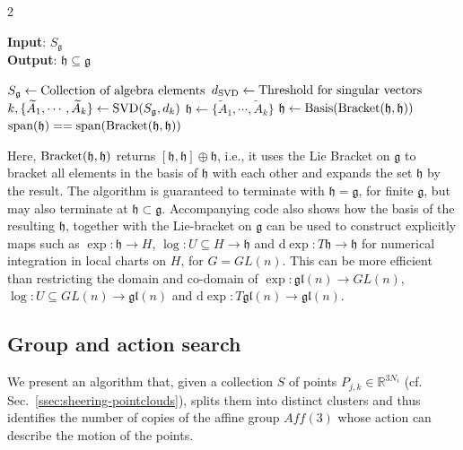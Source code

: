 \documentclass{article}
\newcommand{\g}{\mathfrak{g}}                               %
\newcommand{\h}{\mathfrak{h}}                               %
\newcommand{\R}{\mathbb{R}}                                 %
\newcommand{\ext}{\text{d}}                                 %
\begin{document}
\begin{multicols}{2}
\begin{algorithm}[H]
    \caption{Subalgebra search}\label{app:alg_subalgebra_search}
    \hspace*{\algorithmicindent} \textbf{Input}: $S_\g$ \\
    \hspace*{\algorithmicindent} \textbf{Output}: $\mathfrak{h}\subseteq \g$ 
    \begin{algorithmic}[1]
        \State $S_\g \gets \textnormal{Collection of algebra elements}$
        \State $d_{\textnormal{SVD}} \gets \textnormal{Threshold for singular vectors}$
        \State $k, \{\widetilde{A}_1,\cdots, \widetilde{A}_k\} \gets \textnormal{SVD}(S_\g, d_k)$
        \State $\h \gets \{\widetilde{A}_1,\cdots, \widetilde{A}_k\}$
        \Repeat
            \State $\h \gets \textnormal{Basis}(\textnormal{Bracket}(\h,\h))$
        \Until $\textnormal{span}(\h) == \textnormal{span}(\textnormal{Bracket}(\h,\h))$
    \end{algorithmic}
\end{algorithm}
Here, $\textnormal{Bracket}(\h,\h)$ returns $[\h,\h]\oplus\h$, i.e., it uses the Lie Bracket on $\g$ to bracket all elements in the basis of $\h$ with each other and expands the set $\h$ by the result. The algorithm is guaranteed to terminate with $\h = \g$, for finite $\g$, but may also terminate at $\h \subset \g$.
Accompanying code also shows how the basis of the resulting $\h$, together with the Lie-bracket on $\g$ can be used to construct explicitly maps such as $\exp:\h \rightarrow H$, $\log: U\subseteq H \rightarrow\h$ and $\ext\exp:T \h \rightarrow \h$ for numerical integration in local charts on $H$, for $G = GL(n)$. This can be more efficient than restricting the domain and co-domain of $\exp:\mathfrak{gl}(n)\rightarrow GL(n)$, $\log: U\subseteq GL(n)\rightarrow \mathfrak{gl}(n)$ and $\ext\exp:T \mathfrak{gl}(n)\rightarrow \mathfrak{gl}(n)$.

\subsection{Group and action search}\label{ssec:code-group-action}
We present an algorithm that, given a collection $S$ of points $P_{j,k}\in\R^{3N_i}$ (cf. Sec.~\ref{ssec:sheering-pointclouds}), splits them into distinct clusters and thus identifies the number of copies of the affine group $Aff(3)$ whose action can describe the motion of the points.


\end{multicols}
\end{document}
